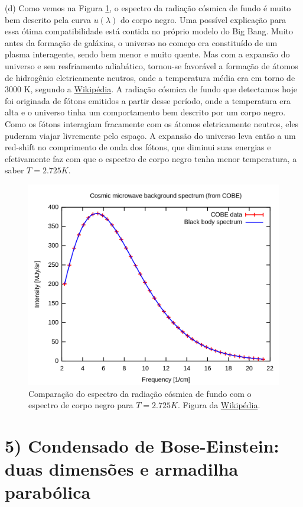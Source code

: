 \documentclass[a4paper,10pt]{article}
\begin{document}
(d) Como vemos na Figura \ref{fig:cosmic}, o espectro da radiação cósmica de fundo é muito bem descrito pela curva $u(\lambda)$ do corpo negro. Uma possível explicação para essa ótima compatibilidade está contida no próprio modelo do Big Bang. Muito antes da formação de galáxias, o universo no começo era constituído de um plasma interagente, sendo bem menor e muito quente. Mas com a expansão do universo e seu resfriamento adiabático, tornou-se favorável a formação de átomos de hidrogênio eletricamente neutros, onde a temperatura média era em torno de 3000 K, segundo a \href{https://en.wikipedia.org/wiki/Cosmic_microwave_background}{Wikipédia}. A radiação cósmica de fundo que detectamos hoje foi originada de fótons emitidos a partir desse período, onde a temperatura era alta e o universo tinha um comportamento bem descrito por um corpo negro. Como os fótons interagiam fracamente com os átomos eletricamente neutros, eles puderam viajar livremente pelo espaço. A expansão do universo leva então a um red-shift no comprimento de onda dos fótons, que diminui suas energias e efetivamente faz com que o espectro de corpo negro tenha menor temperatura, a saber $T = 2.725 \unit{K}$.

\begin{figure}[H]
\centering
\includegraphics[width=0.6\linewidth]{fig/cosmic_bg.png}
\caption{Comparação do espectro da radiação cósmica de fundo com o espectro de corpo negro para $T = 2.725 \unit{K}$. Figura da \href{https://en.wikipedia.org/wiki/Cosmic_microwave_background}{Wikipédia}.}
\label{fig:cosmic}
\end{figure}


\pagebreak

\section*{5) Condensado de Bose-Einstein: duas dimensões e armadilha parabólica}
\end{document}
